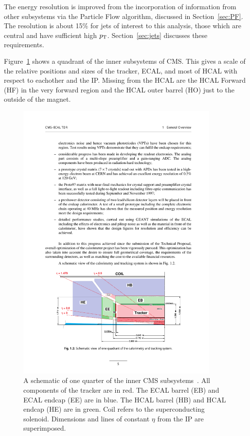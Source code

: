The energy resolution is improved from the incorporation of information from other subsystems via
the Particle Flow algorithm, discussed in Section~\ref{sec:PF}.
The resolution is about 15\% for jets of interest to this analysis, those which are central and
have sufficient high $p_{\rm T}$. Section~\ref{sec:jets} discusses these requirements.

Figure~\ref{fig:subsystems_inner} shows a quadrant of the inner subsystems of CMS. This gives
a scale of the relative positions and sizes of the tracker, ECAL,
and most of HCAL with respect to eachother and the IP. Missing from the HCAL are the 
HCAL Forward (HF) in the very forward region and the HCAL outer barrel (HO) just to the outside of
the magnet.

\begin{figure}[ht]
 \begin{center}
   \includegraphics[width=0.90\textwidth]{figures/experiment/subsystems_inner.pdf}
      \end{center}
\caption{A schematic of one quarter of the inner CMS subsystems~\cite{ecaltdr}.
All components of the tracker are in red. The ECAL barrel (EB) and ECAL endcap (EE) are in blue.
The HCAL barrel (HB) and HCAL endcap (HE) are in green. Coil refers to the superconducting solenoid.
Dimensions and lines of constant $\eta$ from the IP are superimposed.}
\label{fig:subsystems_inner}
\end{figure}


